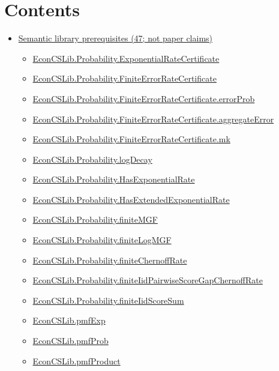 \documentclass[10pt]{article}
\begin{document}
\section*{Contents}
\begin{itemize}[leftmargin=1.2em]
\item \hyperlink{library-section-5cc46fc24f07d5d8}{Semantic library prerequisites (47; not paper claims)}
\begin{itemize}[leftmargin=1.2em]
\item \hyperlink{library-prerequisite-e4ddb15be8735d63}{EconCSLib.Probability.ExponentialRateCertificate}
\item \hyperlink{library-prerequisite-8db74770d326ef06}{EconCSLib.Probability.FiniteErrorRateCertificate}
\item \hyperlink{library-prerequisite-507ef639a856291a}{EconCSLib.Probability.FiniteErrorRateCertificate.errorProb}
\item \hyperlink{library-prerequisite-96ca3fc05cfa53c5}{EconCSLib.Probability.FiniteErrorRateCertificate.aggregateError}
\item \hyperlink{library-prerequisite-1cb4bfc31d236b9e}{EconCSLib.Probability.FiniteErrorRateCertificate.mk}
\item \hyperlink{library-prerequisite-94743506c5de049b}{EconCSLib.Probability.logDecay}
\item \hyperlink{library-prerequisite-380666720005662c}{EconCSLib.Probability.HasExponentialRate}
\item \hyperlink{library-prerequisite-89b5feba54d8b5b3}{EconCSLib.Probability.HasExtendedExponentialRate}
\item \hyperlink{library-prerequisite-6258b3da52471ab5}{EconCSLib.Probability.finiteMGF}
\item \hyperlink{library-prerequisite-20dbd208a81d9e80}{EconCSLib.Probability.finiteLogMGF}
\item \hyperlink{library-prerequisite-84fb7f816d0f0ac9}{EconCSLib.Probability.finiteChernoffRate}
\item \hyperlink{library-prerequisite-d2329585b68dee1c}{EconCSLib.Probability.finiteIidPairwiseScoreGapChernoffRate}
\item \hyperlink{library-prerequisite-e0e20858ab2c39b5}{EconCSLib.Probability.finiteIidScoreSum}
\item \hyperlink{library-prerequisite-e5c7eedc40c11b7a}{EconCSLib.pmfExp}
\item \hyperlink{library-prerequisite-7fec9dedef722fc8}{EconCSLib.pmfProb}
\item \hyperlink{library-prerequisite-38eb9a31a47bfbd9}{EconCSLib.pmfProduct}

\end{itemize}
\end{itemize}
\end{document}
